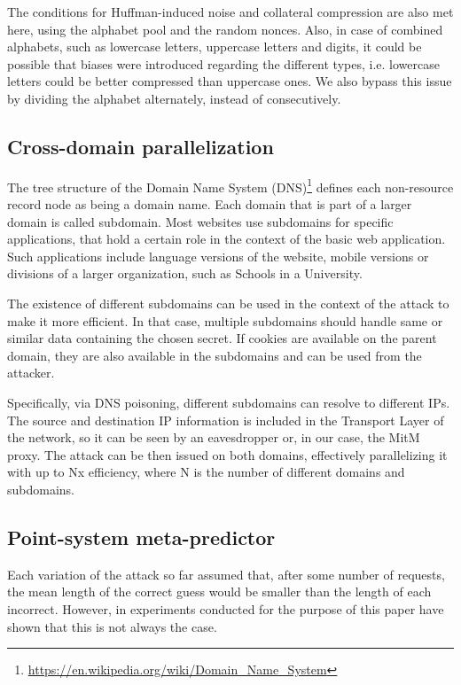 The conditions for Huffman-induced noise and collateral compression are also met
here, using the alphabet pool and the random nonces. Also, in case of combined
alphabets, such as lowercase letters, uppercase letters and digits, it could be
possible that biases were introduced regarding the different types, i.e.
lowercase letters could be better compressed than uppercase ones. We also bypass
this issue by dividing the alphabet alternately, instead of consecutively.

\subsection{Cross-domain parallelization}

The tree structure of the Domain Name System
(DNS)\footnote{\url{https://en.wikipedia.org/wiki/Domain_Name_System}} defines
each non-resource record node as being a domain name. Each domain that is part
of a larger domain is called subdomain. Most websites use subdomains for
specific applications, that hold a certain role in the context of the basic web
application. Such applications include language versions of the website, mobile
versions or divisions of a larger organization, such as Schools in a University.

The existence of different subdomains can be used in the context of the attack
to make it more efficient. In that case, multiple subdomains should handle same
or similar data containing the chosen secret. If cookies are available on the
parent domain, they are also available in the subdomains and can be used from
the attacker.

Specifically, via DNS poisoning, different subdomains can resolve to different
IPs. The source and destination IP information is included in the Transport
Layer of the network, so it can be seen by an eavesdropper or, in our case, the
MitM proxy. The attack can be then issued on both domains, effectively
parallelizing it with up to Nx efficiency, where N is the number of different
domains and subdomains.

\subsection{Point-system meta-predictor}\label{subsec:point_system}

Each variation of the attack so far assumed that, after some number of requests,
the mean length of the correct guess would be smaller than the length of each
incorrect. However, in experiments conducted for the purpose of this paper have
shown that this is not always the case.

